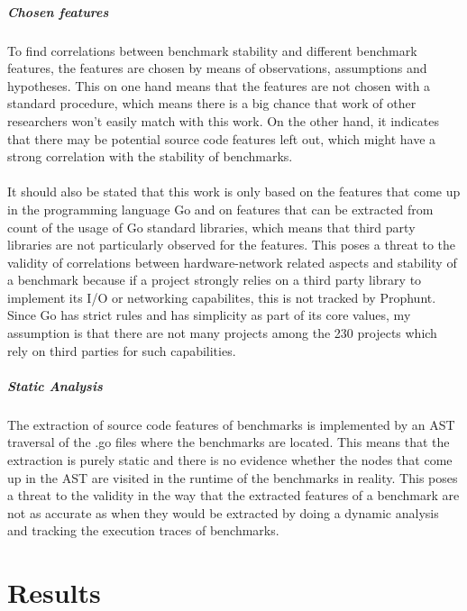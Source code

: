 \documentclass{seal_thesis}
\begin{document}
\paragraph{Chosen features}
To find correlations between benchmark stability and different benchmark features, the features are chosen by means of observations, assumptions and hypotheses. This on one hand means that the features are not chosen with a standard procedure, which means there is a big chance that work of other researchers won't easily match with this work. On the other hand, it indicates that there may be potential source code features left out, which might have a strong correlation with the stability of benchmarks.\\
\\
It should also be stated that this work is only based on the features that come up in the programming language Go and on features that can be extracted from count of the usage of Go standard libraries, which means that third party libraries are not particularly observed for the features. This poses a threat to the validity of correlations between hardware-network related aspects and stability of a benchmark because if a project strongly relies on a third party library to implement its I/O or networking capabilites, this is not tracked by Prophunt. Since Go has strict rules and has simplicity as part of its core values, my assumption is that there are not many projects among the 230 projects which rely on third parties for such capabilities.

\paragraph{Static Analysis}
The extraction of source code features of benchmarks is implemented by an AST traversal of the .go files where the benchmarks are located. This means that the extraction is purely static and there is no evidence whether the nodes that come up in the AST are visited in the runtime of the benchmarks in reality. This poses a threat to the validity in the way that the extracted features of a benchmark are not as accurate as when they would be extracted by doing a dynamic analysis and tracking the execution traces of benchmarks. 


\chapter{Results}
\label{Results}
\end{document}
